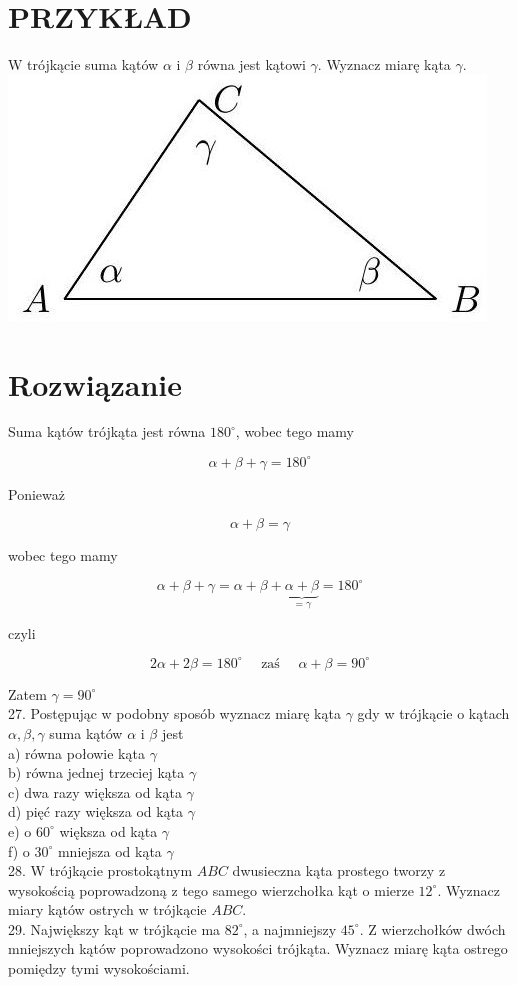 \documentclass[10pt]{article}
\begin{document}
\section*{PRZYKŁAD}
W trójkącie suma kątów \(\alpha\) i \(\beta\) równa jest kątowi \(\gamma\). Wyznacz miarę kąta \(\gamma\).\\
\includegraphics[max width=\textwidth, center]{2024_11_21_71f62bd117d375398909g-023}

\section*{Rozwiązanie}
Suma kątów trójkąta jest równa \(180^{\circ}\), wobec tego mamy

\[
\alpha+\beta+\gamma=180^{\circ}
\]

Ponieważ

\[
\alpha+\beta=\gamma
\]

wobec tego mamy

\[
\alpha+\beta+\gamma=\alpha+\beta+\underbrace{\alpha+\beta}_{=\gamma}=180^{\circ}
\]

czyli

\[
2 \alpha+2 \beta=180^{\circ} \quad \text { zaś } \quad \alpha+\beta=90^{\circ}
\]

Zatem \(\gamma=90^{\circ}\)\\
27. Postępując w podobny sposób wyznacz miarę kąta \(\gamma\) gdy w trójkącie o kątach \(\alpha, \beta, \gamma\) suma kątów \(\alpha\) i \(\beta\) jest\\
a) równa połowie kąta \(\gamma\)\\
b) równa jednej trzeciej kąta \(\gamma\)\\
c) dwa razy większa od kąta \(\gamma\)\\
d) pięć razy większa od kąta \(\gamma\)\\
e) o \(60^{\circ}\) większa od kąta \(\gamma\)\\
f) o \(30^{\circ}\) mniejsza od kąta \(\gamma\)\\
28. W trójkącie prostokątnym \(A B C\) dwusieczna kąta prostego tworzy z wysokością poprowadzoną z tego samego wierzchołka kąt o mierze \(12^{\circ}\). Wyznacz miary kątów ostrych w trójkącie \(A B C\).\\
29. Największy kąt w trójkącie ma \(82^{\circ}\), a najmniejszy \(45^{\circ}\). Z wierzchołków dwóch mniejszych kątów poprowadzono wysokości trójkąta. Wyznacz miarę kąta ostrego pomiędzy tymi wysokościami.
\end{document}

